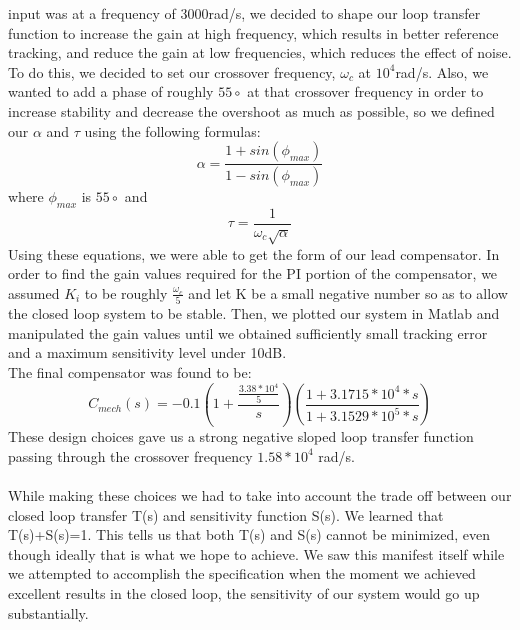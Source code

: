 \documentclass[a4paper, titlepage, 12pt]{article}
\begin{document}
		input was at a frequency of 3000rad/s, we decided to shape our loop transfer
		function to increase the gain at high frequency, which results in better
		reference tracking, and reduce the gain at low frequencies, which reduces
		the effect of noise. \\
		To do this, we decided to set our crossover frequency, $\omega_c$ at $10^4$rad/s.
		Also, we wanted to add a phase of roughly $55\circ$ at that crossover frequency
		in order to increase stability and decrease the overshoot as much as possible,
		so we defined our $\alpha$ and $\tau$ using the following formulas: \\
		\begin{equation*}
			\alpha = \frac{1 + sin(\phi_{max})}{1 - sin(\phi_{max})}
		\end{equation*}
		where $\phi_{max}$ is $55\circ$ and
		\begin{equation*}
			\tau = \frac{1}{\omega_c\sqrt{\alpha}}
		\end{equation*}
		Using these equations, we were able to get the form of our lead compensator.
		In order to find the gain values required for the PI portion of the compensator,
		we assumed $K_i$ to be roughly $\frac{\omega_c}{5}$ and let K be a small
		negative number so as to allow the closed loop system to be stable. Then,
		we plotted our system in Matlab and manipulated the gain values until we
		obtained sufficiently small tracking error and a maximum sensitivity level
		under 10dB. \\
		The final compensator was found to be: \\
		\begin{equation*}
			C_{mech}(s) = -0.1(1 + \frac{\frac{3.38*10^4}{5}}{s})(\frac{1+3.1715*10^4*s}{1+3.1529*10^5*s})
		\end{equation*}
		These design choices gave us a strong negative sloped loop transfer
		function passing through the crossover frequency $1.58*10^4$ rad/s. \\\\
		While making these choices we had to take into account the trade off
		between our closed loop transfer T(s) and sensitivity function S(s).
		We learned that T(s)+S(s)=1. This tells us that both T(s) and S(s)
		cannot be minimized, even though ideally that is what we hope to achieve. 
		We saw this manifest itself while we attempted to accomplish the
		specification when the moment we achieved excellent results in the
		closed loop, the sensitivity of our system would go up substantially.
		
\end{document}
